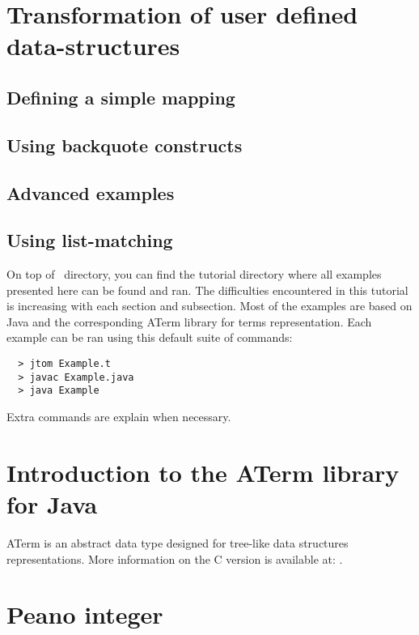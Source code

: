 \section{Transformation of user defined data-structures}

\subsection{Defining a simple mapping}

\subsection{Using backquote constructs}

\subsection{Advanced examples}

\subsection{Using list-matching}



On top of \TOM\ directory, you can find the tutorial directory where
all examples presented here can be found and ran.
The difficulties encountered in this tutorial is increasing with each
section and subsection. Most of the examples are based on Java and the
corresponding ATerm library for terms representation.
Each example can be ran using this default suite of commands:
\begin{verbatim}
  > jtom Example.t
  > javac Example.java
  > java Example
\end{verbatim}

Extra commands are explain when necessary.

\section{Introduction to the ATerm library for Java}

ATerm is an abstract data type designed for tree-like data structures
representations.
More information on the C version is available at: 
.

\section{Peano integer}

